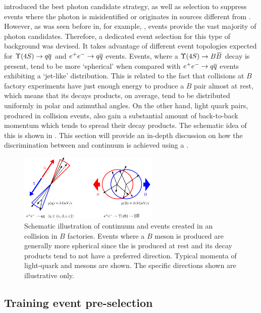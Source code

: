  introduced the best photon candidate strategy, 
as well as selection to suppress events 
where the photon is misidentified or originates in sources different from \BtoXsgamma.
However, as was seen before in, for example, ,
\epem\ra\qqbar events provide the vast majority of photon candidates.
Therefore, a dedicated event selection for this type of background was devised.
It takes advantage of different event topologies expected for $\FourS\to\qqbar$ and $e^+e^-\rightarrow q\overline q$ events.
Events, where a $\FourS\to\BB$ decay is present, tend to be more `spherical' when compared with $e^+e^-\rightarrow q\overline q$ events exhibiting a `jet-like' distribution.
This is related to the fact that \epem collisions at $B$ factory experiments have just enough energy to produce a $B$ pair almost at rest, which means that its decays products, on average, tend to be distributed uniformly in polar and azimuthal angles.
On the other hand, light quark pairs, produced in \epem collision events, also gain a substantial amount of back-to-back momentum which tends to spread their decay products. 
The schematic idea of this is shown in .
This section will provide an in-depth discussion on how the discrimination between \BtoXsgamma and continuum is achieved using a \BDT.

\begin{figure}[htbp!]
    \centering
    \includegraphics[width=0.6\textwidth]{figures/continuum_suppression/figure_continuum_suppression_event_shapes.pdf}
    \caption{\label{fig:continuum_schematic} Schematic illustration of continuum and \BB events created in an \epem collision in $B$ factories.
    Events where a $B$ meson is produced are generally more spherical since the \FourS is produced at rest and its decay products tend to not have a preferred direction.
    Typical momenta of light-quark and \BB mesons are shown.
    The specific directions shown are illustrative only. 
    }
\end{figure}

\subsection{Training event pre-selection}\label{sec:preselection}


